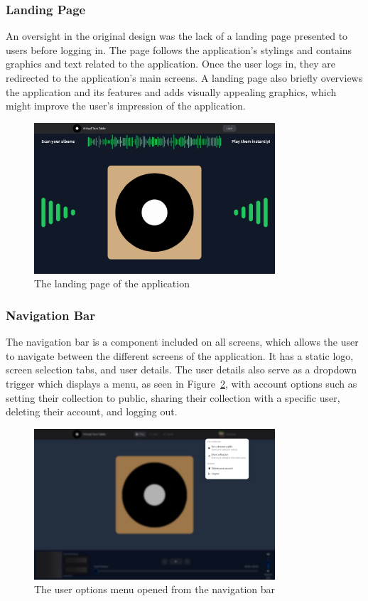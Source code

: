 \subsubsection{Landing Page}
An oversight in the original design was the lack of a landing page presented to users before logging in. The page follows the application's stylings and contains graphics and text related to the application. Once the user logs in, they are redirected to the application's main screens. A landing page also briefly overviews the application and its features and adds visually appealing graphics, which might improve the user's impression of the application.

\begin{figure} [H]
    \centering
    \includegraphics[width=0.8\textwidth]{figures/landing_page.png}
    \caption{The landing page of the application}
    \label{fig:landing_page}
\end{figure}

\subsubsection{Navigation Bar}
The navigation bar is a component included on all screens, which allows the user to navigate between the different screens of the application. It has a static logo, screen selection tabs, and user details. The user details also serve as a dropdown trigger which displays a menu, as seen in Figure~\ref{fig:user_options_menu}, with account options such as setting their collection to public, sharing their collection with a specific user, deleting their account, and logging out.

\begin{figure} [H]
    \centering
    \includegraphics[width=0.8\textwidth]{figures/menu_open_screen.png}
    \caption{The user options menu opened from the navigation bar}
    \label{fig:user_options_menu}
\end{figure}

